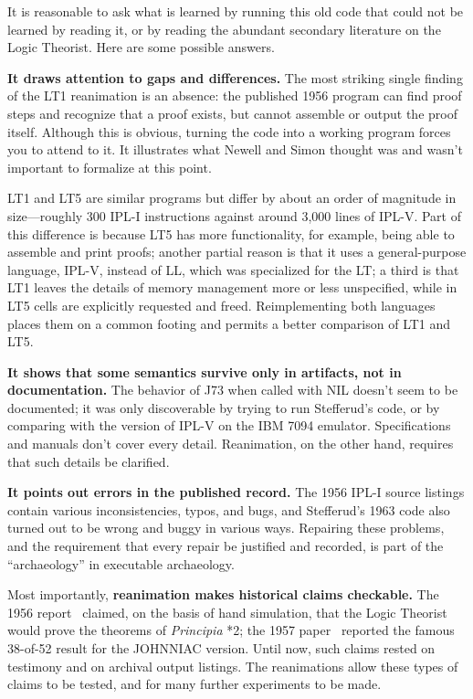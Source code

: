 \documentclass{IEEEcsmag}
\begin{document}
%
%

It is reasonable to ask what is learned by running this old code that
could not be learned by reading it, or by reading the abundant
secondary literature on the Logic Theorist. Here are some
possible answers.

\textbf{It draws attention to gaps and differences.}
The most striking single finding of the LT1 reanimation is an
absence: the published 1956 program can find proof steps and 
recognize that a proof exists, but cannot assemble
or output the proof itself.  Although this is obvious, turning
the code into a working program forces you to attend to it. 
It illustrates what Newell and Simon
thought was and wasn't important to formalize at this point.

LT1 and LT5 are similar programs but
differ by about an order of magnitude in size---roughly 300
IPL-I instructions against around 3,000 lines of
IPL-V.  Part of this difference is because LT5 has more
functionality, for example, being able to
assemble and print proofs; another partial reason is that it uses
a general-purpose language, IPL-V, instead of LL, which was
specialized for the LT; a third is that LT1 leaves the details
of memory management more or less unspecified, while in LT5
cells are explicitly requested and freed.  Reimplementing 
both languages places them on a common footing and permits a 
better comparison of LT1 and LT5.

\textbf{It shows that some semantics survive only in artifacts, not
in documentation.}  The behavior of J73 when called with NIL
doesn't seem to be documented; it was
only discoverable by trying to run Stefferud's code, or by
comparing with the version of IPL-V on the IBM 7094 emulator.
Specifications and manuals don't cover every detail. Reanimation, on the other hand,
requires that such details be clarified.

\textbf{It points out errors in the published record.}  The 1956 
IPL-I source listings contain various inconsistencies, typos, and
bugs, and Stefferud's 1963 code also turned out to be wrong and
buggy in various ways.  Repairing these problems, and the requirement
that every repair be justified and recorded, is part of the ``archaeology''
in executable archaeology.

Most importantly, \textbf{reanimation makes historical claims checkable.} The 1956
report~\cite{cip1956} claimed, on the basis of hand simulation, that the Logic
Theorist would prove the theorems of \textit{Principia} *2; the 
1957 paper~\cite{LT1957} reported the famous 38-of-52 result for the JOHNNIAC version.
Until now, such claims rested on testimony and on archival output
listings.  The reanimations allow these types of claims to be tested, 
and for many further experiments to be made.
\end{document}
